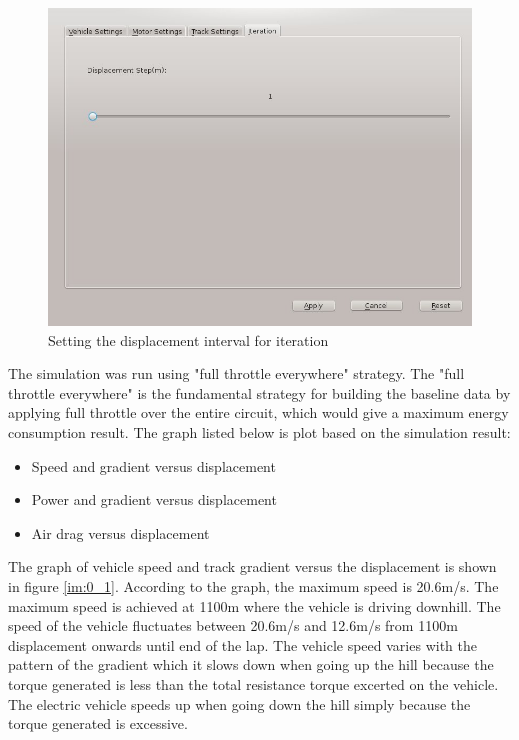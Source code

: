 \begin{figure}[htb]
	\centering
	\includegraphics[width=5in]{images/iteration_step.jpg}
	\caption{Setting the displacement interval for iteration}
	\label{im:iterationStep}
\end{figure}

The simulation was run using "full throttle everywhere" strategy. The "full throttle everywhere" is the fundamental strategy for building the baseline data by applying full throttle over the entire circuit, which would give a maximum energy consumption result. The graph listed below is plot based on the simulation result:

\begin{itemize}
	\item{Speed and gradient versus displacement}
	\item{Power and gradient versus displacement}
	\item{Air drag versus displacement}
\end{itemize}

The graph of vehicle speed and track gradient versus the displacement is shown in figure \ref{im:0_1}. According to the graph, the maximum speed is 20.6m/s. The maximum speed is achieved at 1100m where the vehicle is driving downhill. The speed of the vehicle fluctuates between 20.6m/s and 12.6m/s from 1100m displacement onwards until end of the lap. The vehicle speed varies with the pattern of the gradient which it slows down when going up the hill because the torque generated is less than the total resistance torque excerted on the vehicle. The electric vehicle speeds up when going down the hill simply because the torque generated is excessive.

